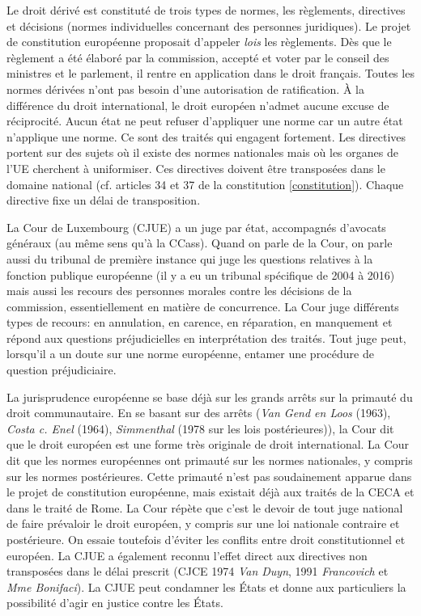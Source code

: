 \documentclass[math]{cours}
\begin{document}
\smallskip

Le droit dérivé est constituté de trois types de normes, les règlements, directives et décisions (normes individuelles concernant des personnes juridiques).
Le projet de constitution européenne proposait d'appeler \emph{lois} les règlements.
Dès que le règlement a été élaboré par la commission, accepté et voter par le conseil des ministres et le parlement, il rentre en application dans le droit français.
Toutes les normes dérivées n'ont pas besoin d'une autorisation de ratification.
À la différence du droit international, le droit européen n'admet aucune excuse de réciprocité.
Aucun état ne peut refuser d'appliquer une norme car un autre état n'applique une norme.
Ce sont des traités qui engagent fortement.
Les directives portent sur des sujets où il existe des normes nationales mais où les organes de l'UE cherchent à uniformiser.
Ces directives doivent être transposées dans le domaine national (cf. articles 34 et 37 de la constitution \ref{constitution}).
Chaque directive fixe un délai de transposition.

\smallskip

La Cour de Luxembourg (CJUE) a un juge par état, accompagnés d'avocats généraux (au même sens qu'à la CCass).
Quand on parle de la Cour, on parle aussi du tribunal de première instance qui juge les questions relatives à la fonction publique européenne (il y a eu un tribunal spécifique de 2004 à 2016) mais aussi les recours des personnes morales contre les décisions de la commission, essentiellement en matière de concurrence.
La Cour juge différents types de recours: en annulation, en carence, en réparation, en manquement et répond aux questions préjudicielles en interprétation des traités.
Tout juge peut, lorsqu'il a un doute sur une norme européenne, entamer une procédure de question préjudiciaire.

La jurisprudence européenne se base déjà sur les grands arrêts sur la primauté du droit communautaire.
En se basant sur des arrêts (\textit{Van Gend en Loos} (1963), \textit{Costa c. Enel} (1964), \textit{Simmenthal} (1978 sur les lois postérieures)), la Cour dit que le droit européen est une forme très originale de droit international.
La Cour dit que les normes européennes ont primauté sur les normes nationales, y compris sur les normes postérieures.
Cette primauté n'est pas soudainement apparue dans le projet de constitution européenne, mais existait déjà aux traités de la CECA et dans le traité de Rome.
La Cour répète que c'est le devoir de tout juge national de faire prévaloir le droit européen, y compris sur une loi nationale contraire et postérieure.
On essaie toutefois d'éviter les conflits entre droit constitutionnel et européen.
La CJUE a également reconnu l'effet direct aux directives non transposées dans le délai prescrit (CJCE 1974 \textit{Van Duyn}, 1991 \textit{Francovich} et \textit{Mme Bonifaci}).
La CJUE peut condamner les États et donne aux particuliers la possibilité d'agir en justice contre les États.
\end{document}
